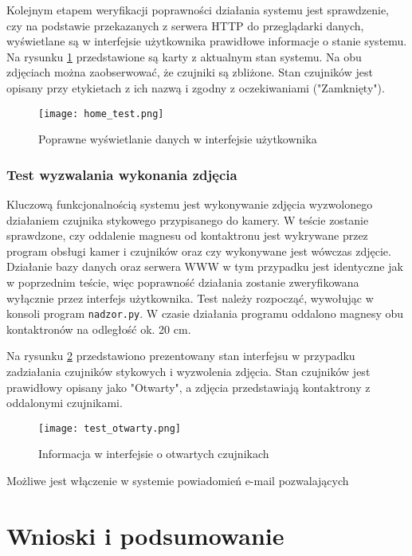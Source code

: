\documentclass[a4paper,11pt,twoside]{article}
\begin{document}
Kolejnym etapem weryfikacji poprawności działania systemu jest sprawdzenie, czy na podstawie przekazanych z serwera HTTP do przeglądarki danych, wyświetlane są w interfejsie użytkownika prawidłowe informacje o stanie systemu. Na rysunku \ref{fig: home_test} przedstawione są karty z aktualnym stan systemu. Na obu zdjęciach można zaobserwować, że czujniki są zbliżone. Stan czujników jest opisany przy etykietach z ich nazwą i zgodny z oczekiwaniami ("Zamknięty").

\begin{figure}
\begin{center}
\texttt{[image: home\_test.png]}
\caption{Poprawne wyświetlanie danych w interfejsie użytkownika}
\label{fig: home_test}
\end{center}
\end{figure}

\subsubsection{Test wyzwalania wykonania zdjęcia}
Kluczową funkcjonalnością systemu jest wykonywanie zdjęcia wyzwolonego działaniem czujnika stykowego przypisanego do kamery. W teście zostanie sprawdzone, czy oddalenie magnesu od kontaktronu jest wykrywane przez program obsługi kamer i czujników oraz czy wykonywane jest wówczas zdjęcie. Działanie bazy danych oraz serwera WWW w tym przypadku jest identyczne jak w poprzednim teście, więc poprawność działania zostanie zweryfikowana wyłącznie przez interfejs użytkownika. Test należy rozpocząć, wywołując w konsoli program \texttt{nadzor.py}. W czasie działania programu oddalono magnesy obu kontaktronów na odległość ok. 20 cm.

Na rysunku \ref{fig: test_otwarty} przedstawiono prezentowany stan interfejsu w przypadku zadziałania czujników stykowych i wyzwolenia zdjęcia. Stan czujników jest prawidłowy opisany jako "Otwarty", a zdjęcia przedstawiają kontaktrony z oddalonymi czujnikami.
\begin{figure}[H]
\begin{center}
\texttt{[image: test\_otwarty.png]}
\caption{Informacja w interfejsie o otwartych czujnikach}
\label{fig: test_otwarty}
\end{center}
\end{figure}

Możliwe jest włączenie w systemie powiadomień e-mail pozwalających 

\newpage
\section{Wnioski i podsumowanie}
\end{document}

